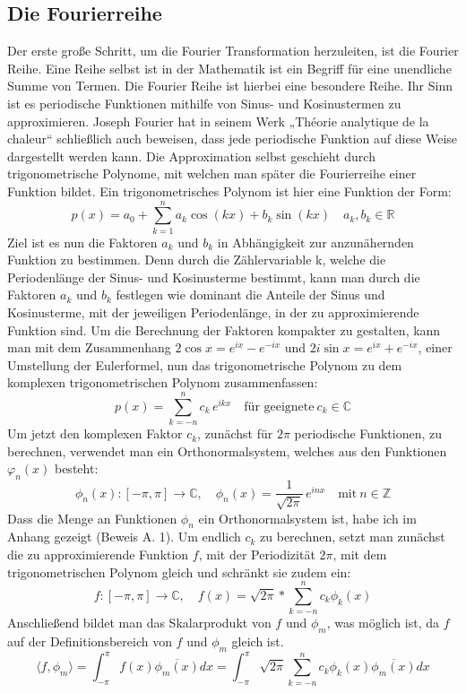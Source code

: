 \documentclass[a4paper,12pt]{article}
\begin{document}
\subsection{Die Fourierreihe}
Der erste große Schritt, um die Fourier Transformation herzuleiten, ist die Fourier Reihe. 
Eine Reihe selbst ist in der Mathematik ist ein Begriff für eine unendliche Summe von Termen. 
Die Fourier Reihe ist hierbei eine besondere Reihe. Ihr Sinn ist es periodische Funktionen 
mithilfe von Sinus- und Kosinustermen zu approximieren.  Joseph Fourier hat in seinem Werk 
„Théorie analytique de la chaleur“ schließlich auch beweisen, dass jede periodische Funktion 
auf diese Weise dargestellt werden kann. Die Approximation selbst geschieht durch 
trigonometrische Polynome, mit welchen man später die Fourierreihe einer Funktion bildet. 
Ein trigonometrisches Polynom ist hier eine Funktion der Form: 
$$p(x) = a_0 + \sum_{k=1}^n{a_k \cos(kx) + b_k \sin(kx)}  \quad a_k,b_k \in \mathbb{R}$$
Ziel ist es nun die Faktoren $a_k$ und $b_k$ in Abhängigkeit zur anzunähernden Funktion zu 
bestimmen. Denn durch die Zählervariable k, welche die Periodenlänge der Sinus- und 
Kosinusterme bestimmt, kann man durch die Faktoren $a_k$ und $b_k$ festlegen wie dominant 
die Anteile der Sinus und Kosinusterme, mit der jeweiligen Periodenlänge, in der zu 
approximierende Funktion sind. Um die Berechnung der Faktoren kompakter zu gestalten, 
kann man mit dem Zusammenhang $2\cos{x} = e^{ix} -e^{-ix}$ und $2i\sin{x} = e^{ix}+e^{-ix}$, 
einer Umstellung der Eulerformel, nun das trigonometrische Polynom zu dem komplexen 
trigonometrischen Polynom zusammenfassen: 
$$p(x) = \sum_{k=-n}^n{c_k \, e^{ikx}} \quad \text{für geeignete} \: c_k \in \mathbb{C}$$
Um jetzt den komplexen Faktor $c_k$, zunächst für $2\pi$ periodische Funktionen, 
zu berechnen, verwendet man ein Orthonormalsystem, welches aus den Funktionen $\varphi_n(x)$ besteht:
$$\phi_n(x):[-\pi,\pi] \to \mathbb{C}, \quad \phi_n(x) = \frac{1}{\sqrt{2\pi}} \, e^{inx} \quad \text{mit} \: n\in \mathbb{Z}$$
Dass die Menge an Funktionen $\phi_n$ ein Orthonormalsystem ist, habe 
ich im Anhang gezeigt (Beweis A. 1). Um endlich $c_k$ zu berechnen, setzt man zunächst 
die zu approximierende Funktion $f$, mit der Periodizität $2\pi$, mit dem 
trigonometrischen Polynom gleich und schränkt sie zudem ein: 
$$f:[-\pi,\pi]\to \mathbb{C},\quad f(x) = \sqrt{2\pi} * \sum_{k = -n}^n{c_k\phi_k(x)} $$
Anschließend bildet man das Skalarprodukt von $f$ und $\phi_m$, was möglich ist, da 
$f$ auf der Definitionsbereich von $f$ und $\phi_m$ gleich ist. 
$$\langle f, \phi_m \rangle = \int_{-\pi}^\pi {f(x) \overline{\phi_m(x)}dx} = \int_{-\pi}^\pi{\sqrt{2\pi}\sum_{k = -n}^n{c_k\phi_k(x)\overline{\phi_m(x)}}dx}$$
\end{document}

